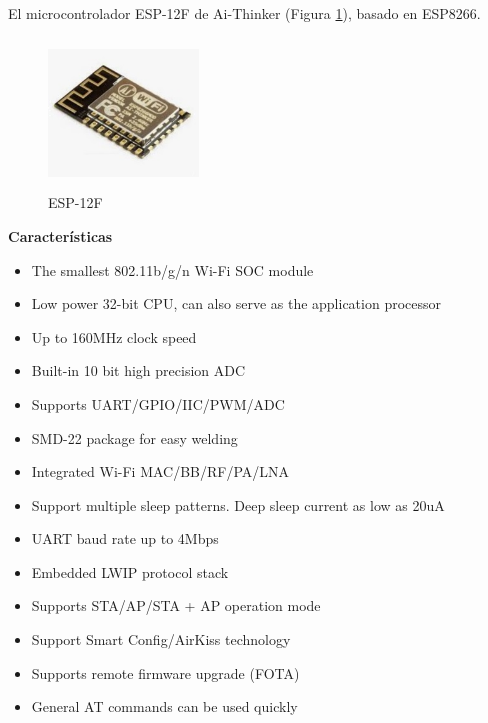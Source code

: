     El microcontrolador ESP-12F de Ai-Thinker (Figura \ref{imag:esp-12F}), basado en ESP8266.

    \begin{figure}[H]
        \centering
        \includegraphics[width=4cm, height=4cm]{imagenes/esp-12F.jpeg}
        \caption{ESP-12F}
        \label{imag:esp-12F}
    \end{figure}

    \textbf{Características}

    \begin{itemize}
        \item The smallest 802.11b/g/n Wi-Fi SOC module
        \item Low power 32-bit CPU, can also serve as the application processor
        \item Up to 160MHz clock speed
        \item Built-in 10 bit high precision ADC
        \item Supports UART/GPIO/IIC/PWM/ADC
        \item SMD-22 package for easy welding
        \item Integrated Wi-Fi MAC/BB/RF/PA/LNA
        \item Support multiple sleep patterns. Deep sleep current as low as 20uA
        \item UART baud rate up to 4Mbps
        \item Embedded LWIP protocol stack
        \item Supports STA/AP/STA + AP operation mode
        \item Support Smart Config/AirKiss technology
        \item Supports remote firmware upgrade (FOTA)
        \item General AT commands can be used quickly
    \end{itemize}

